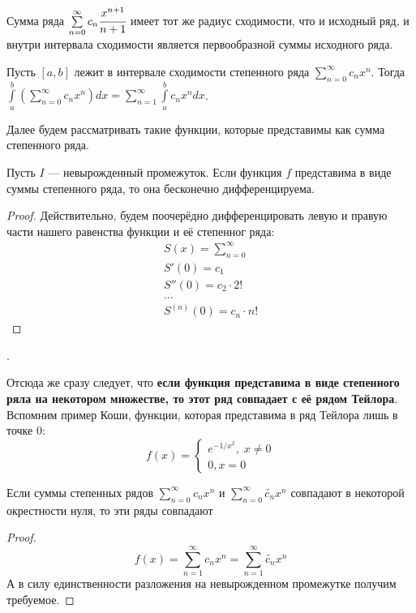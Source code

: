 \documentclass[a4paper, 12pt]{article}
\begin{document}
\begin{Consequence}
    Сумма ряда $\sum\limits_{n=0}^{\infty}c_n \cfrac{x^{n+1}}{n + 1}$ имеет тот же радиус сходимости, что и исходный ряд, и внутри интервала сходимости является первообразной суммы исходного ряда.
\end{Consequence}
\begin{Consequence}
    Пусть $[a,b]$ лежит в интервале сходимости степенного ряда $\sum\limits_{n = 0}^{\infty}c_n x^n$. Тогда $\int\limits_a^b\left(\sum\limits_{n = 0}^{\infty}c_n x^n\right)dx = \sum\limits_{n= 1}^{\infty} \int\limits_a^bc_n x^ndx$.
\end{Consequence}
Далее будем рассматривать такие функции, которые представимы как сумма степенного ряда.
\begin{Statement}
    Пусть $I$ --- невырожденный промежуток. Если функция $f$ представима в виде суммы степенного ряда, то она бесконечно дифференцируема.
\end{Statement}
\begin{proof}
    Действительно, будем поочерёдно дифференцировать левую и правую части нашего равенства функции и её степенног ряда:
    \begin{gather*}
        S(x) = \sum\limits_{n = 0}^{\infty}\\
        S'(0) = c_1\\
        S''(0) = c_2\cdot 2!\\
        \ldots\\
        S^{(n)}(0) = c_n \cdot n!
    \end{gather*}
\end{proof}.
\par Отсюда же сразу следует, что \textbf{если функция представима в виде степенного ряла на некотором множестве, то этот ряд совпадает с её рядом Тейлора}.
Вспомним пример Коши, функции, которая представима в ряд Тейлора лишь в точке 0:
\[
    f(x) = 
    \begin{cases*}
        e^{-1/x^2}, \; x \neq 0\\
        0, x = 0
    \end{cases*}
\]
\begin{Consequence}
    Если суммы степенных рядов $\sum\limits_{n=0}^{\infty}c_n x^n$ и $\sum\limits_{n=0}^{\infty}\widetilde{c_n} x^n$ совпадают в некоторой окрестности нуля, то эти ряды совпадают  
\end{Consequence}
\begin{proof}
    \[
        f(x) = \sum\limits_{n=1}^{\infty} c_n x^n = \sum\limits_{n=1}^{\infty} \widetilde{c_n} x^n
    \]
    А в силу единственности разложения на невырожденном промежутке получим требуемое.
\end{proof}
\end{document}
